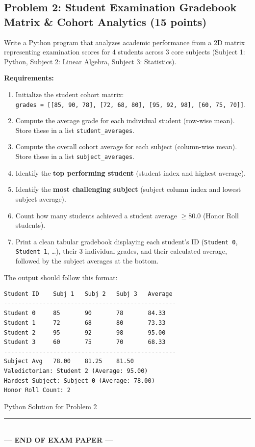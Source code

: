 \documentclass[11pt,a4paper]{article}
\begin{document}
\subsection*{Problem 2: Student Examination Gradebook Matrix \& Cohort Analytics (15 points)}
Write a Python program that analyzes academic performance from a 2D matrix representing examination scores for 4 students across 3 core subjects (Subject 1: Python, Subject 2: Linear Algebra, Subject 3: Statistics).

\textbf{Requirements:}
\begin{enumerate}[leftmargin=2em,label=\arabic*.,itemsep=1pt]
  \item Initialize the student cohort matrix:\\
  \texttt{grades = [[85, 90, 78], [72, 68, 80], [95, 92, 98], [60, 75, 70]]}.
  \item Compute the average grade for each individual student (row-wise mean). Store these in a list \texttt{student\_averages}.
  \item Compute the overall cohort average for each subject (column-wise mean). Store these in a list \texttt{subject\_averages}.
  \item Identify the \textbf{top performing student} (student index and highest average).
  \item Identify the \textbf{most challenging subject} (subject column index and lowest subject average).
  \item Count how many students achieved a student average $\ge 80.0$ (Honor Roll students).
  \item Print a clean tabular gradebook displaying each student's ID (\texttt{Student 0}, \texttt{Student 1}, \dots), their 3 individual grades, and their calculated average, followed by the subject averages at the bottom.
\end{enumerate}

The output should follow this format:
\begin{lstlisting}
Student ID    Subj 1   Subj 2   Subj 3   Average 
-------------------------------------------------
Student 0     85       90       78       84.33
Student 1     72       68       80       73.33
Student 2     95       92       98       95.00
Student 3     60       75       70       68.33
-------------------------------------------------
Subject Avg   78.00    81.25    81.50   
Valedictorian: Student 2 (Average: 95.00)
Hardest Subject: Subject 0 (Average: 78.00)
Honor Roll Count: 2
\end{lstlisting}

\begin{answerbox}[height=10.5cm]{Python Solution for Problem 2}
\end{answerbox}

\vfill
\begin{center}
  \rule{0.5\textwidth}{0.4pt}\\[1mm]
  \textbf{\color{primaryblue}--- END OF EXAM PAPER ---}
\end{center}
\end{document}
